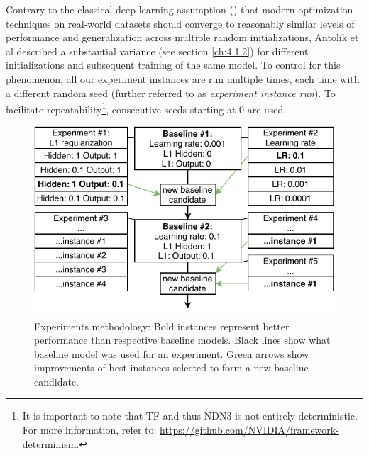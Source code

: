 Contrary to the classical deep learning assumption (\citep{2017arXiv170610239W}) that modern optimization techniques on real-world datasets should converge to reasonably similar levels of performance and generalization across multiple random initializations, Antolik et al described a substantial variance (see section \ref{ch:4.1.2}) for different initializations and subsequent training of the same model. To control for this phenomenon, all our experiment instances are run multiple times, each time with a different random seed (further referred to as \textit{experiment instance run}). To facilitate repeatability\footnote{It is important to note that TF and thus NDN3 is not entirely deterministic. For more information, refer to: \href{https://github.com/NVIDIA/framework-determinism}{https://github.com/NVIDIA/framework-determinism}.}, consecutive seeds starting at 0 are used.

\begin{figure}[ht]
    \centering
    \includegraphics[]{../figures/04_explor_1}
    \caption[Experiments methodology]{Experiments methodology: Bold instances represent better performance than respective baseline models. Black lines show what baseline model was used for an experiment. Green arrows show improvements of best instances selected to form a new baseline candidate.}
    \label{fig:4.1}
\end{figure}

